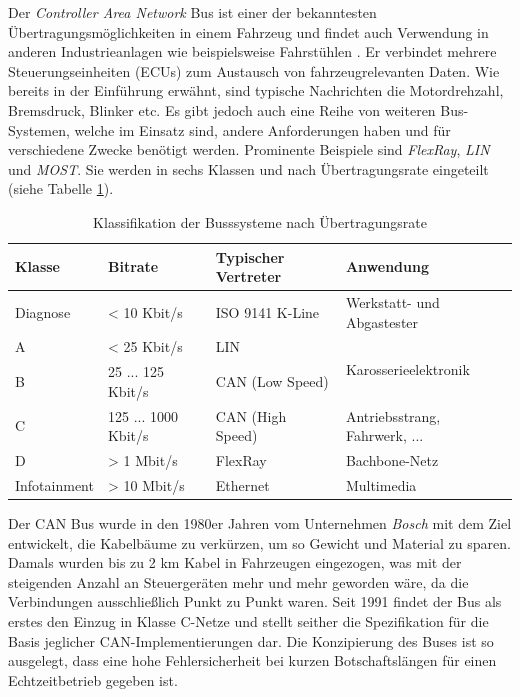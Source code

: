 Der \textit{Controller Area Network} Bus ist einer der bekanntesten Übertragungsmöglichkeiten in einem Fahrzeug und findet auch Verwendung in anderen Industrieanlagen wie beispielsweise Fahrstühlen \cite{Zimmermann2014}. Er verbindet mehrere Steuerungseinheiten (ECUs) zum Austausch von fahrzeugrelevanten Daten. Wie bereits in der Einführung erwähnt, sind typische Nachrichten die Motordrehzahl, Bremsdruck, Blinker etc. Es gibt jedoch auch eine Reihe von weiteren Bus-Systemen, welche im Einsatz sind, andere Anforderungen haben und für verschiedene Zwecke benötigt werden. Prominente Beispiele sind \textit{FlexRay}, \textit{LIN} und \textit{MOST}. Sie werden in sechs Klassen und nach Übertragungsrate eingeteilt (siehe Tabelle \ref{tab:bus_systems}).

\begin{table}[htbp]
    \centering
    \caption{Klassifikation der Busssysteme nach Übertragungsrate \cite{Zimmermann2014}}
    \label{tab:bus_systems}
    \begin{tabular}{|l|l|l|l|}
        \hline
        Klasse & Bitrate & Typischer Vertreter & Anwendung \\
        \hline
        Diagnose & < 10 Kbit/s & ISO 9141 K-Line & Werkstatt- und Abgastester \\
        A & < 25 Kbit/s & LIN & \multirow{2}{*}{Karosserieelektronik}\\
        B & 25 ... 125 Kbit/s & CAN (Low Speed) & \\
        C & 125 ... 1000 Kbit/s & CAN (High Speed) & Antriebsstrang, Fahrwerk, ... \\
        D & > 1 Mbit/s & FlexRay & Bachbone-Netz \\
        Infotainment & > 10 Mbit/s & Ethernet & Multimedia \\
        \hline
  \end{tabular}
\end{table}

Der CAN Bus wurde in den 1980er Jahren vom Unternehmen \textit{Bosch} mit dem Ziel entwickelt, die Kabelbäume zu verkürzen, um so Gewicht und Material zu sparen. Damals wurden bis zu 2 km Kabel in Fahrzeugen eingezogen, was mit der steigenden Anzahl an Steuergeräten mehr und mehr geworden wäre, da die Verbindungen ausschließlich Punkt zu Punkt waren. Seit 1991 findet der Bus als erstes den Einzug in Klasse C-Netze und stellt seither die Spezifikation für die Basis jeglicher CAN-Implementierungen dar. Die Konzipierung des Buses ist so ausgelegt, dass eine hohe Fehlersicherheit bei kurzen Botschaftslängen für einen Echtzeitbetrieb gegeben ist.

